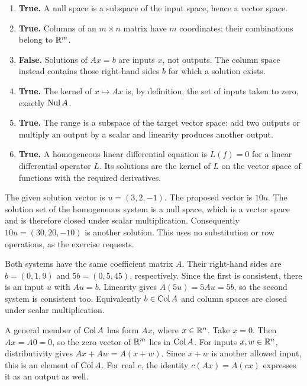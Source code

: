 \begin{enumerate}[label=(\alph*)]
\item \textbf{True.} A null space is a subspace of the input space, hence a vector space.
\item \textbf{True.} Columns of an $m\times n$ matrix have $m$ coordinates;
their combinations belong to $\mathbb{R}^m$.
\item \textbf{False.} Solutions of $Ax=b$ are inputs $x$, not outputs.
The column space instead contains those right-hand sides $b$ for which a solution exists.
\item \textbf{True.} The kernel of $x\mapsto Ax$ is, by definition, the set
of inputs taken to zero, exactly $\operatorname{Nul} A$.
\item \textbf{True.} The range is a subspace of the target vector space:
add two outputs or multiply an output by a scalar and linearity produces another output.
\item \textbf{True.} A homogeneous linear differential equation is
$L(f)=0$ for a linear differential operator $L$. Its solutions are the kernel
of $L$ on the vector space of functions with the required derivatives.
\end{enumerate}

The given solution vector is $u=(3,2,-1)$. The proposed vector is $10u$.
The solution set of the homogeneous system is a null space, which is a
vector space and is therefore closed under scalar multiplication.
Consequently $10u=(30,20,-10)$ is another solution. This uses no substitution
or row operations, as the exercise requests.

Both systems have the same coefficient matrix $A$. Their right-hand sides
are $b=(0,1,9)$ and $5b=(0,5,45)$, respectively.
Since the first is consistent, there is an input $u$ with $Au=b$.
Linearity gives $A(5u)=5Au=5b$, so the second system is consistent too.
Equivalently $b\in\operatorname{Col} A$ and column spaces are closed under scalar multiplication.

A general member of $\operatorname{Col} A$ has form $Ax$, where $x\in\mathbb{R}^n$.
Take $x=0$. Then $Ax=A0=0$, so the zero vector of $\mathbb{R}^m$ lies in $\operatorname{Col} A$.
For inputs $x,w\in\mathbb{R}^n$, distributivity gives $Ax+Aw=A(x+w)$.
Since $x+w$ is another allowed input, this is an element of $\operatorname{Col} A$.
For real $c$, the identity $c(Ax)=A(cx)$ expresses it as an output as well.

